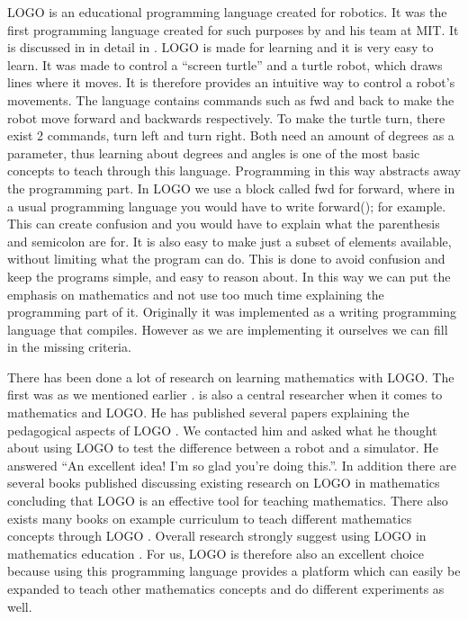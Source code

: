\bigskip\noindent
LOGO is an educational programming language created for robotics. It was the first programming language created for such purposes by \citeauthor{papert1980mindstorms} and his team at MIT. It is discussed in in detail in \cite{papert1980mindstorms}. LOGO is made for learning and it is very easy to learn. It was made to control a ``screen turtle'' and a turtle robot, which draws lines where it moves. It is therefore provides an intuitive way to control a robot's movements. The language contains commands such as fwd and back to make the robot move forward and backwards respectively. To make the turtle turn, there exist 2 commands, turn left and turn right. Both need an amount of degrees as a parameter, thus learning about degrees and angles is one of the most basic concepts to teach through this language. Programming in this way abstracts away the programming part. In LOGO we use a block called fwd for forward, where in a usual programming language you would have to write forward(); for example. This can create confusion and you would have to explain what the parenthesis and semicolon are for. It is also easy to make just a subset of elements available, without limiting what the program can do. This is done to avoid confusion and keep the programs simple, and easy to reason about. In this way we can put the emphasis on mathematics and not use too much time explaining the programming part of it. Originally it was implemented as a writing programming language that compiles. However as we are implementing it ourselves we can fill in the missing criteria.

\bigskip\noindent
There has been done a lot of research on learning mathematics with LOGO. The first was as we mentioned earlier \cite{papert1980mindstorms}. \citeauthor{clements2001logo} is also a central researcher when it comes to mathematics and LOGO. He has published several papers explaining the pedagogical aspects of LOGO \cite{clements2001logo, clements1990effects, clements1996development, clements1993research}. We contacted him and asked what he thought about using LOGO to test the difference between a robot and a simulator. He answered ``An excellent idea! I'm so glad you're doing this.''. In addition there are several books published discussing existing research on LOGO in mathematics concluding that LOGO is an effective tool for teaching mathematics. There also exists many books on example curriculum to teach different mathematics concepts through LOGO \cite{hoyles1992learning}. Overall research strongly suggest using LOGO in mathematics education \cite{jones2005using}. For us, LOGO is therefore also an excellent choice because using this programming language provides a platform which can easily be expanded to teach other mathematics concepts and do different experiments as well. 

